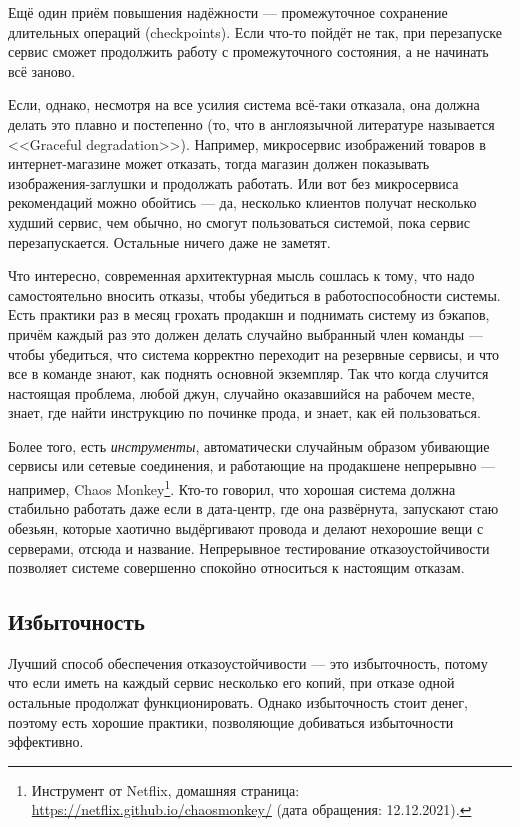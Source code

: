 \documentclass{../text-style}
\begin{document}
Ещё один приём повышения надёжности --- промежуточное сохранение длительных операций (checkpoints). Если что-то пойдёт не так, при перезапуске сервис сможет продолжить работу с промежуточного состояния, а не начинать всё заново.

Если, однако, несмотря на все усилия система всё-таки отказала, она должна делать это плавно и постепенно (то, что в англоязычной литературе называется <<Graceful degradation>>). Например, микросервис изображений товаров в интернет-магазине может отказать, тогда магазин должен показывать изображения-заглушки и продолжать работать. Или вот без микросервиса рекомендаций можно обойтись --- да, несколько клиентов получат несколько худший сервис, чем обычно, но смогут пользоваться системой, пока сервис перезапускается. Остальные ничего даже не заметят.

Что интересно, современная архитектурная мысль сошлась к тому, что надо самостоятельно вносить отказы, чтобы убедиться в работоспособности системы. Есть практики раз в месяц грохать продакшн и поднимать систему из бэкапов, причём каждый раз это должен делать случайно выбранный член команды --- чтобы убедиться, что система корректно переходит на резервные сервисы, и что все в команде знают, как поднять основной экземпляр. Так что когда случится настоящая проблема, любой джун, случайно оказавшийся на рабочем месте, знает, где найти инструкцию по починке прода, и знает, как ей пользоваться.

Более того, есть \emph{инструменты}, автоматически случайным образом убивающие сервисы или сетевые соединения, и работающие на продакшене непрерывно --- например, Chaos Monkey\footnote{Инструмент от Netflix, домашняя страница: \url{https://netflix.github.io/chaosmonkey/} (дата обращения: 12.12.2021).}. Кто-то говорил, что хорошая система должна стабильно работать даже если в дата-центр, где она развёрнута, запускают стаю обезьян, которые хаотично выдёргивают провода и делают нехорошие вещи с серверами, отсюда и название. Непрерывное тестирование отказоустойчивости позволяет системе совершенно спокойно относиться к настоящим отказам.

\subsection{Избыточность}

Лучший способ обеспечения отказоустойчивости --- это избыточность, потому что если иметь на каждый сервис несколько его копий, при отказе одной остальные продолжат функционировать. Однако избыточность стоит денег, поэтому есть хорошие практики, позволяющие добиваться избыточности эффективно.
\end{document}
